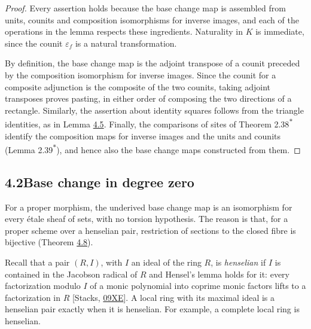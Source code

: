 \documentclass[11pt]{article}
\newcommand{\bpout}[1]{#1\textsuperscript{\hyperlink{bp-outside}{\ensuremath{\ast}}}}
\begin{document}
\begin{proof}[{Proof}]\label{bp21}%
Every assertion holds because the base change map is assembled from units, counits and composition isomorphisms for inverse images, and each of the operations in the lemma respects these ingredients. Naturality in \(K\) is immediate, since the counit \(\varepsilon_f\) is a natural transformation.

By definition, the base change map is the adjoint transpose of a counit preceded by the composition isomorphism for inverse images. Since the counit for a composite adjunction is the composite of the two counits, taking adjoint transposes proves pasting, in either order of composing the two directions of a rectangle. Similarly, the assertion about identity squares follows from the triangle identities, as in Lemma \hyperref[bp15]{4.5}. Finally, the comparisons of sites of Theorem \bpout{2.38} identify the composition maps for inverse images and the units and counits (Lemma \bpout{2.39}), and hence also the base change maps constructed from them.
\end{proof}


\subsection*{\texorpdfstring{4.2\quad Base change in degree zero}{4.2 Base change in degree zero}}
\label{bp22}%
\label{bp23}%
For a proper morphism, the underived base change map is an isomorphism for every étale sheaf of sets, with no torsion hypothesis. The reason is that, for a proper scheme over a henselian pair, restriction of sections to the closed fibre is bijective (Theorem \hyperref[bp24]{4.8}).

Recall that a pair \((R,I)\), with \(I\) an ideal of the ring \(R\), is \emph{henselian} if \(I\) is contained in the Jacobson radical of \(R\) and Hensel's lemma holds for it: every factorization modulo \(I\) of a monic polynomial into coprime monic factors lifts to a factorization in \(R\) [Stacks, \href{https://stacks.math.columbia.edu/tag/09XE}{09XE}]. A local ring with its maximal ideal is a henselian pair exactly when it is henselian. For example, a complete local ring is henselian.
\end{document}
